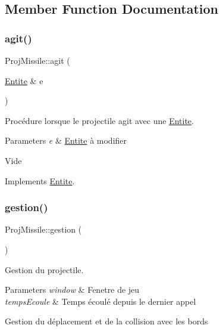 \subsection{Member Function Documentation}
\mbox{\label{class_proj_missile_a8125c442857f7a0fc2d0ff442c39aca7}} 
\subsubsection{\texorpdfstring{agit()}{agit()}}
{\footnotesize\ttfamily Proj\+Missile\+::agit (\begin{DoxyParamCaption}\item[{\mbox{\hyperlink{class_entite}{Entite}} \&}]{e }\end{DoxyParamCaption})\hspace{0.3cm}{\ttfamily [virtual]}}



Procédure lorsque le projectile agit avec une \mbox{\hyperlink{class_entite}{Entite}}. 


\begin{DoxyParams}{Parameters}
{\em e} & \mbox{\hyperlink{class_entite}{Entite}} à modifier\\
\hline
\end{DoxyParams}
Vide 

Implements \mbox{\hyperlink{class_entite_a848ec47afac1d7ba970a2bcab5dc7b3b}{Entite}}.

\mbox{\label{class_proj_missile_a90bee0454d77d2846431f2c8704e2d11}} 
\subsubsection{\texorpdfstring{gestion()}{gestion()}}
{\footnotesize\ttfamily Proj\+Missile\+::gestion (\begin{DoxyParamCaption}{ }\end{DoxyParamCaption})\hspace{0.3cm}{\ttfamily [virtual]}}



Gestion du projectile. 


\begin{DoxyParams}{Parameters}
{\em window} & Fenetre de jeu \\
\hline
{\em temps\+Ecoule} & Temps écoulé depuis le dernier appel\\
\hline
\end{DoxyParams}
Gestion du déplacement et de la collision avec les bords 

